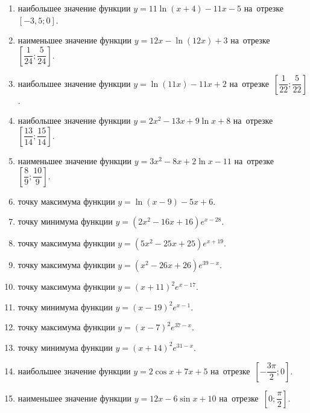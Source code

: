 \documentclass[a4paper,10pt]{article}
\begin{document}
\begin{enumerate}
\item {} наибольшее значение функции $y = 11\ln \left(x+4\right)-11x -5$ на~отрезке~$\left[-3,5;0\right]$.

\item {} наименьшее значение функции $y=12x-\ln \left(12x\right)+3$ на~отрезке~$\left[\dfrac{1}{24};\dfrac{5}{24}\right]$.

\item {} наибольшее значение функции $y=\ln \left(11x\right)-11x+2$ на~отрезке~$\left[\dfrac{1}{22};\dfrac{5}{22}\right]$.

\item {} наибольшее значение функции $y=2x^2-13x+9\ln x+8$ на~отрезке~$\left[\dfrac{13}{14};\dfrac{15}{14}\right]$.

\item {} наименьшее значение функции $y=3x^2-8x+2\ln x-11$ на~отрезке~$\left[\dfrac{8}{9};\dfrac{10}{9}\right]$.

\item {} точку максимума функции $y=\ln \left(x-9\right)-5x+6$.

\item {} точку минимума функции $y=\left(2x^2-16x+16\right)e^{x-28}$.

\item {} точку максимума функции $y=\left(5x^2-25x+25\right)e^{x+19}$.

\item {} точку максимума функции $y=\left(x^2-26x+26\right)e^{39-x}$.

\item {} точку максимума функции $y=\left(x +11\right)^2e^{x-17}$.

\item {} точку минимума функции $y=\left(x -19\right)^2e^{x-1}$.

\item {} точку максимума функции $y=\left(x -7\right)^2e^{37-x}$.

\item {} точку минимума функции $y=\left(x +14\right)^2e^{31-x}$.

\item {} наибольшее значение функции $y=2\cos x+7x +5$ на~отрезке~$\left[-\dfrac{3\pi }{2};0\right]$.

\item {} наименьшее значение функции $y=12x-6\sin x +10$ на~отрезке~$\left[0;\dfrac{\pi }{2}\right]$.


\end{enumerate}
\end{document}
